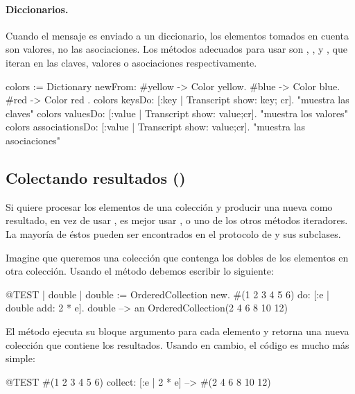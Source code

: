 \documentclass[a4paper,10pt,twoside]{book}
\begin{document}


\paragraph{Diccionarios.}
Cuando el mensaje  es enviado a un diccionario, los elementos tomados en cuenta son valores, no las asociaciones. Los m\'etodos adecuados para usar son , , y , que iteran en las claves, valores o asociaciones respectivamente.

\begin{code}{}
colors := Dictionary newFrom: { #yellow -> Color yellow. #blue -> Color blue. #red -> Color red }.
colors keysDo: [:key | Transcript show: key; cr].                    "muestra las claves"
colors valuesDo: [:value | Transcript show: value;cr].            "muestra los valores"
colors associationsDo: [:value | Transcript show: value;cr].  "muestra las asociaciones"
\end{code}

\subsection{Colectando resultados ()}
Si quiere procesar los elementos de una colecci\'on y producir una nueva como resultado, en vez de usar , es mejor usar , o uno de los otros m\'etodos iteradores.
La mayor\'ia de \'estos pueden ser encontrados en el protocolo  de  y sus subclases.

Imagine que queremos una colecci\'on que contenga los dobles de los elementos en otra colecci\'on. Usando el m\'etodo  debemos escribir lo siguiente:

\begin{code}{@TEST | double |}
double := OrderedCollection new.
#(1 2 3 4 5 6) do: [:e | double add: 2 * e].
double --> an OrderedCollection(2 4 6 8 10 12)
\end{code}

\noindent
El m\'etodo  ejecuta su bloque argumento para cada elemento y retorna una nueva colecci\'on que contiene los resultados. 
Usando  en cambio, el c\'odigo es mucho m\'as simple:
\begin{code}{@TEST}
#(1 2 3 4 5 6) collect: [:e | 2 * e] --> #(2 4 6 8 10 12)
\end{code}
\end{document}
